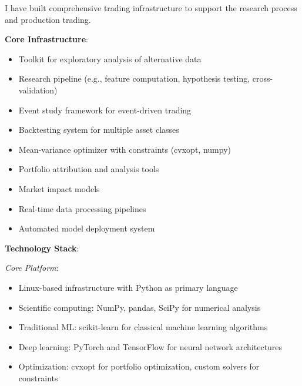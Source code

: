 \documentclass[11pt, letterpaper]{article}
\begin{document}
  I have built comprehensive trading infrastructure to support the
  research process and production trading.

  \textbf{Core Infrastructure}:

  \begin{itemize}
    \item Toolkit for exploratory analysis of alternative data

    \item Research pipeline (e.g., feature computation, hypothesis testing,
      cross-validation)

    \item Event study framework for event-driven trading

    \item Backtesting system for multiple asset classes

    \item Mean-variance optimizer with constraints (cvxopt, numpy)

    \item Portfolio attribution and analysis tools

    \item Market impact models

    \item Real-time data processing pipelines

    \item Automated model deployment system
  \end{itemize}

  \textbf{Technology Stack}:

  \emph{Core Platform}:

  \begin{itemize}
    \item Linux-based infrastructure with Python as primary language

    \item Scientific computing: NumPy, pandas, SciPy for numerical
      analysis

    \item Traditional ML: scikit-learn for classical machine learning
      algorithms

    \item Deep learning: PyTorch and TensorFlow for neural network
      architectures

    \item Optimization: cvxopt for portfolio optimization, custom solvers
      for constraints
  \end{itemize}
\end{document}
